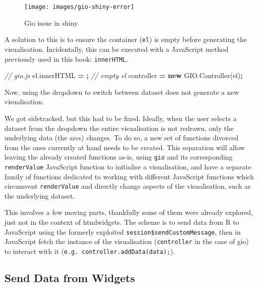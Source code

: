 \documentclass[
  10pt,
]{krantz}
\makeatletter
\newenvironment{Shaded}{\begin{snugshade}}{\end{snugshade}}
\newcommand{\AttributeTok}[1]{\textcolor[rgb]{0.61,0.61,0.61}{#1}}
\newcommand{\CommentTok}[1]{\textcolor[rgb]{0.37,0.37,0.37}{\textit{#1}}}
\newcommand{\KeywordTok}[1]{\textcolor[rgb]{0.27,0.27,0.27}{\textbf{#1}}}
\newcommand{\NormalTok}[1]{#1}
\newcommand{\OperatorTok}[1]{\textcolor[rgb]{0.43,0.43,0.43}{\textbf{#1}}}
\newcommand{\StringTok}[1]{\textcolor[rgb]{0.5,0.5,0.5}{#1}}
\newcommand{\VariableTok}[1]{\textcolor[rgb]{0,0,0}{#1}}
\newenvironment{kframe}{%
\medskip{}
\setlength{\fboxsep}{.8em}
 \def\at@end@of@kframe{}%
 \ifinner\ifhmode%
  \def\at@end@of@kframe{\end{minipage}}%
  \begin{minipage}{\columnwidth}%
 \fi\fi%
 \def\FrameCommand##1{\hskip\@totalleftmargin \hskip-\fboxsep
 \colorbox{shadecolor}{##1}\hskip-\fboxsep
     \hskip-\linewidth \hskip-\@totalleftmargin \hskip\columnwidth}%
 \MakeFramed {\advance\hsize-\width
   \@totalleftmargin\z@ \linewidth\hsize
   \@setminipage}}%
 {\par\unskip\endMakeFramed%
 \at@end@of@kframe}
\renewenvironment{Shaded}{\begin{kframe}}{\end{kframe}}
\makeatother
\begin{document}
\begin{figure}[H]

{\centering \texttt{[image: images/gio-shiny-error]} 

}

\caption{Gio issue in shiny}\label{fig:gio-shiny-error}
\end{figure}

A solution to this is to ensure the container (\texttt{el}) is empty before generating the visualisation. Incidentally, this can be executed with a JavaScript method previously used in this book: \texttt{innerHTML}.

\begin{Shaded}
\begin{Highlighting}[]
\CommentTok{// gio.js}
\VariableTok{el}\NormalTok{.}\AttributeTok{innerHTML} \OperatorTok{=} \StringTok{\textquotesingle{}\textquotesingle{}}\OperatorTok{;} \CommentTok{// empty el}
\NormalTok{controller }\OperatorTok{=} \KeywordTok{new} \VariableTok{GIO}\NormalTok{.}\AttributeTok{Controller}\NormalTok{(el)}\OperatorTok{;}
\end{Highlighting}
\end{Shaded}

Now, using the dropdown to switch between dataset does not generate a new visualisation.

We got sidetracked, but this had to be fixed. Ideally, when the user selects a dataset from the dropdown the entire visualisation is not redrawn, only the underlying data (the arcs) changes. To do so, a new set of functions divorced from the ones currently at hand needs to be created. This separation will allow leaving the already created functions as-is, using \texttt{gio} and its corresponding \texttt{renderValue} JavaScript function to initialise a visualisation, and have a separate family of functions dedicated to working with different JavaScript functions which circumvent \texttt{renderValue} and directly change aspects of the visualisation, such as the underlying dataset.

This involves a few moving parts, thankfully some of them were already explored, just not in the context of htmlwidgets. The scheme is to send data from R to JavaScript using the formerly exploited \texttt{session\$sendCustomMessage}, then in JavaScript fetch the instance of the visualisation (\texttt{controller} in the case of gio) to interact with it (\texttt{e.g.\ controller.addData(data);}).

\hypertarget{shiny-widgets-send-data}{%
\subsection{Send Data from Widgets}\label{shiny-widgets-send-data}}
\end{document}
